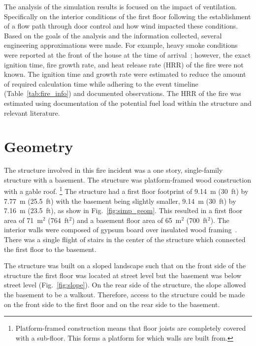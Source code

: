 \documentclass[12pt,oneside]{book}
\begin{document}
The analysis of the simulation results is focused on the impact of ventilation. Specifically on the interior conditions of the first floor following the establishment of a flow path through door control and how wind impacted these conditions. Based on the goals of the analysis and the information collected, several engineering approximations were made. For example, heavy smoke conditions were reported at the front of the house at the time of arrival~\cite{PGCounty2013}; however, the exact ignition time, fire growth rate, and heat release rate (HRR) of the fire were not known. The ignition time and growth rate were estimated to reduce the amount of required calculation time while adhering to the event timeline (Table~\ref{tab:fire_info}) and documented observations. The HRR of the fire was estimated using documentation of the potential fuel load within the structure and relevant literature.

\section{Geometry}
\label{geom}
The structure involved in this fire incident was a one story, single-family structure with a basement. The structure was platform-framed wood construction with a gable roof. \footnote{Platform-framed construction means that floor joists are completely covered with a sub-floor. This forms a platform for which walls are built from.} The structure had a first floor footprint of 9.14~m (30~ft) by 7.77~m (25.5~ft) with the basement being slightly smaller, 9.14~m (30~ft) by 7.16~m (23.5~ft), as show in Fig.~\ref{fig:simp_geom}. This resulted in a first floor area of 71~m$^2$ (764~ft$^2$) and a basement floor area of 65~m$^2$ (700~ft$^2$). The interior walls were composed of gypsum board over insulated wood framing~\cite{PGCounty2013}. There was a single flight of stairs in the center of the structure which connected the first floor to the basement. 

The structure was built on a sloped landscape such that on the front side of the structure the first floor was located at street level but the basement was below street level (Fig.~\ref{fig:slope}). On the rear side of the structure, the slope allowed the basement to be a walkout. Therefore, access to the structure could be made on the front side to the first floor and on the rear side to the basement.
\end{document}
